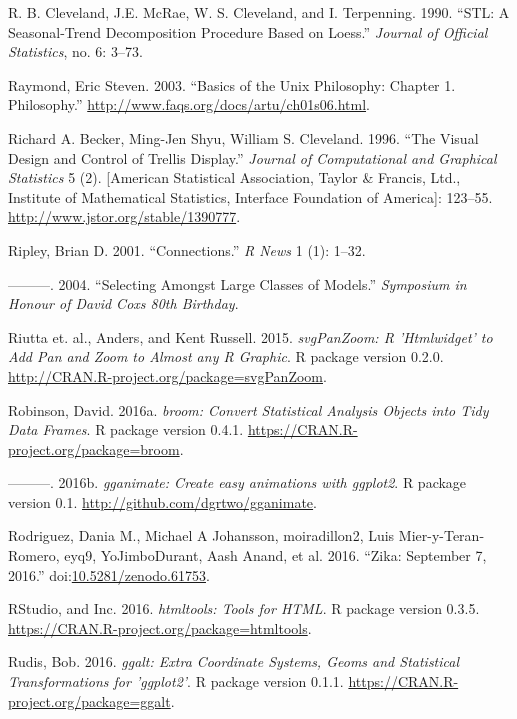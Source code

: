 \documentclass[12pt,]{isuthesis}
\begin{document}
\hypertarget{ref-stl}{}
R. B. Cleveland, J.E. McRae, W. S. Cleveland, and I. Terpenning. 1990.
``STL: A Seasonal-Trend Decomposition Procedure Based on Loess.''
\emph{Journal of Official Statistics}, no. 6: 3--73.

\hypertarget{ref-unix-philosophy}{}
Raymond, Eric Steven. 2003. ``Basics of the Unix Philosophy: Chapter 1.
Philosophy.'' \url{http://www.faqs.org/docs/artu/ch01s06.html}.

\hypertarget{ref-trellis}{}
Richard A. Becker, Ming-Jen Shyu, William S. Cleveland. 1996. ``The
Visual Design and Control of Trellis Display.'' \emph{Journal of
Computational and Graphical Statistics} 5 (2). {[}American Statistical
Association, Taylor \& Francis, Ltd., Institute of Mathematical
Statistics, Interface Foundation of America{]}: 123--55.
\url{http://www.jstor.org/stable/1390777}.

\hypertarget{ref-Connections}{}
Ripley, Brian D. 2001. ``Connections.'' \emph{R News} 1 (1): 1--32.

\hypertarget{ref-Ripley:2004}{}
---------. 2004. ``Selecting Amongst Large Classes of Models.''
\emph{Symposium in Honour of David Coxs 80th Birthday}.

\hypertarget{ref-svgPanZoom}{}
Riutta et. al., Anders, and Kent Russell. 2015. \emph{svgPanZoom: R
'Htmlwidget' to Add Pan and Zoom to Almost any R Graphic}. R package
version 0.2.0. \url{http://CRAN.R-project.org/package=svgPanZoom}.

\hypertarget{ref-broom}{}
Robinson, David. 2016a. \emph{broom: Convert Statistical Analysis
Objects into Tidy Data Frames}. R package version 0.4.1.
\url{https://CRAN.R-project.org/package=broom}.

\hypertarget{ref-gganimate}{}
---------. 2016b. \emph{gganimate: Create easy animations with ggplot2}.
R package version 0.1. \url{http://github.com/dgrtwo/gganimate}.

\hypertarget{ref-zika-data}{}
Rodriguez, Dania M., Michael A Johansson, moiradillon2, Luis
Mier-y-Teran-Romero, eyq9, YoJimboDurant, Aash Anand, et al. 2016.
``Zika: September 7, 2016.''
doi:\href{https://doi.org/10.5281/zenodo.61753}{10.5281/zenodo.61753}.

\hypertarget{ref-htmltools}{}
RStudio, and Inc. 2016. \emph{htmltools: Tools for HTML}. R package
version 0.3.5. \url{https://CRAN.R-project.org/package=htmltools}.

\hypertarget{ref-ggalt}{}
Rudis, Bob. 2016. \emph{ggalt: Extra Coordinate Systems, Geoms and
Statistical Transformations for 'ggplot2'}. R package version 0.1.1.
\url{https://CRAN.R-project.org/package=ggalt}.
\end{document}
